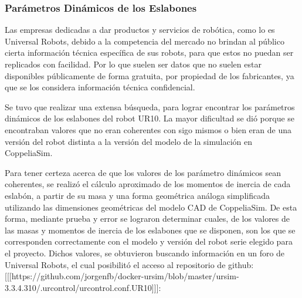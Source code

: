 \documentclass{article}
\begin{document}
\subsubsection*{Parámetros Dinámicos de los Eslabones}
\label{sec:Parámetros Dinámicos de los Eslabones}

Las empresas dedicadas a dar productos y servicios de robótica, como lo es Universal Robots, debido a la competencia del mercado no brindan al público cierta información técnica específica de sus robots, para que estos no puedan ser replicados con facilidad. Por lo que suelen ser datos que no suelen estar disponibles públicamente de forma gratuita, por propiedad de los fabricantes, ya que se los considera información técnica confidencial.

Se tuvo que realizar una extensa búsqueda, para lograr encontrar los parámetros dinámicos de los eslabones del robot UR10. La mayor dificultad se dió porque se encontraban valores que no eran coherentes con sigo mismos o bien eran de una  versión del robot distinta a la versión del modelo de la simulación en CoppeliaSim.

Para tener certeza acerca de que los valores de los parámetro dinámicos sean coherentes, se realizó el cálculo aproximado de los momentos de inercia de cada eslabón, a partir de su masa y una forma geométrica análoga simplificada utilizando las dimensiones geométricas del modelo CAD de CoppeliaSim. De esta forma, mediante prueba y error se lograron determinar cuales, de los valores de las masas y momentos de inercia de los eslabones que se disponen, son los que se corresponden correctamente con el modelo y versión del robot serie elegido para el proyecto. Dichos valores, se obtuvieron buscando información en un foro de Universal Robots, el cual posibilitó el acceso al repositorio de github: [[[https://github.com/jorgenfb/docker-ursim/blob/master/ursim-3.3.4.310/.urcontrol/urcontrol.conf.UR10]]]:
\end{document}
